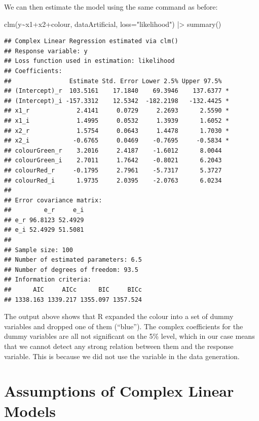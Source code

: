 \documentclass[
]{book}
\newenvironment{Shaded}{\begin{snugshade}}{\end{snugshade}}
\newcommand{\AttributeTok}[1]{\textcolor[rgb]{0.77,0.63,0.00}{#1}}
\newcommand{\FunctionTok}[1]{\textcolor[rgb]{0.00,0.00,0.00}{#1}}
\newcommand{\NormalTok}[1]{#1}
\newcommand{\SpecialCharTok}[1]{\textcolor[rgb]{0.00,0.00,0.00}{#1}}
\newcommand{\StringTok}[1]{\textcolor[rgb]{0.31,0.60,0.02}{#1}}
\begin{document}
We can then estimate the model using the same command as before:

\begin{Shaded}
\begin{Highlighting}[]
\FunctionTok{clm}\NormalTok{(y}\SpecialCharTok{\textasciitilde{}}\NormalTok{x1}\SpecialCharTok{+}\NormalTok{x2}\SpecialCharTok{+}\NormalTok{colour, dataArtificial, }\AttributeTok{loss=}\StringTok{"likelihood"}\NormalTok{) }\SpecialCharTok{|\textgreater{}}
    \FunctionTok{summary}\NormalTok{()}
\end{Highlighting}
\end{Shaded}

\begin{verbatim}
## Complex Linear Regression estimated via clm()
## Response variable: y
## Loss function used in estimation: likelihood
## Coefficients:
##                Estimate Std. Error Lower 2.5% Upper 97.5%  
## (Intercept)_r  103.5161    17.1840    69.3946    137.6377 *
## (Intercept)_i -157.3312    12.5342  -182.2198   -132.4425 *
## x1_r             2.4141     0.0729     2.2693      2.5590 *
## x1_i             1.4995     0.0532     1.3939      1.6052 *
## x2_r             1.5754     0.0643     1.4478      1.7030 *
## x2_i            -0.6765     0.0469    -0.7695     -0.5834 *
## colourGreen_r    3.2016     2.4187    -1.6012      8.0044  
## colourGreen_i    2.7011     1.7642    -0.8021      6.2043  
## colourRed_r     -0.1795     2.7961    -5.7317      5.3727  
## colourRed_i      1.9735     2.0395    -2.0763      6.0234  
## 
## Error covariance matrix:
##         e_r     e_i
## e_r 96.8123 52.4929
## e_i 52.4929 51.5081
## 
## Sample size: 100
## Number of estimated parameters: 6.5
## Number of degrees of freedom: 93.5
## Information criteria:
##      AIC     AICc      BIC     BICc 
## 1338.163 1339.217 1355.097 1357.524
\end{verbatim}

The output above shows that R expanded the colour into a set of dummy variables and dropped one of them (``blue''). The complex coefficients for the dummy variables are all not significant on the 5\% level, which in our case means that we cannot detect any strong relation between them and the response variable. This is because we did not use the variable in the data generation.

\hypertarget{assumptions}{%
\chapter{Assumptions of Complex Linear Models}\label{assumptions}}
\end{document}
